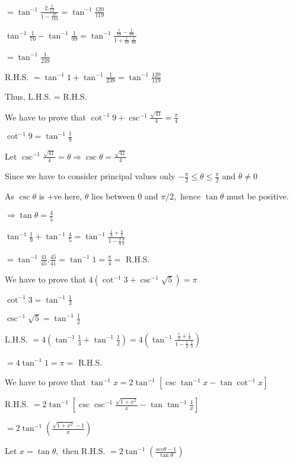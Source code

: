   $= \tan^{-1}\frac{2.\frac{5}{12}}{1 - \frac{25}{144}} = \tan^{-1}\frac{120}{119}$

  $\tan^{-1}\frac{1}{70} - \tan^{-1}\frac{1}{99} = \tan^{-1}\frac{\frac{1}{70} - \frac{1}{99}}{1 +
    \frac{1}{70}.\frac{1}{99}}$

  $= \tan^{-1}\frac{1}{239}$

  R.H.S. $= \tan^{-1}1 + \tan^{-1}\frac{1}{239} = \tan^{-1}\frac{120}{119}$

  Thus, L.H.S. = R.H.S.

\item We have to prove that $\cot^{-1}9 + \csc^{-1}\frac{\sqrt{41}}{4} = \frac{\pi}{4}$

  $\cot^{-1}9 = \tan^{-1}\frac{1}{9}$

  Let $\csc^{-1}\frac{\sqrt{41}}{4} = \theta \Rightarrow \csc\theta = \frac{\sqrt{41}}{4}$

  Since we have to consider principal values only $-\frac{\pi}{2}\leq \theta\leq \frac{\pi}{2}$ and $\theta \neq 0$

  As $\csc\theta$ is +ve here, $\theta$ lies between $0$ and $\pi/2,$ hence $\tan\theta$ must be
  positive.

  $\Rightarrow \tan\theta = \frac{4}{5}$

  $\tan^{-1}\frac{1}{9} + \tan^{-1}\frac{4}{5} = \tan^{-1}\frac{\frac{1}{9} + \frac{4}{5}}{1 - \frac{1}{9}\frac{4}{5}}$

  $=\tan^{-1}\frac{41}{45}.\frac{45}{41} = \tan^{-1}1 = \frac{\pi}{4} =$ R.H.S.

\item We have to prove that $4(\cot^{-1}3 + \csc^{-1}\sqrt{5}) = \pi$

  $\cot^{-1}3 = \tan^{-1}\frac{1}{3}$

  $\csc^{-1}\sqrt{5} = \tan^{-1}\frac{1}{2}$

  L.H.S. $=4(\tan^{-1}\frac{1}{3} + \tan^{-1}\frac{1}{2}) = 4\left(\tan^{-1}\frac{\frac{1}{2} + \frac{1}{3}}{1 -
    \frac{1}{2}.\frac{1}{3}}\right)$

  $= 4\tan^{-1}1 = \pi =$ R.H.S.

\item We have to prove that $\tan^{-1}x = 2\tan^{-1}[\csc\tan^{-1}x - \tan\cot^{-1}x]$

  R.H.S. $= 2\tan^{-1}[\csc\csc^{-1}\frac{\sqrt{1 + x^2}}{x} - \tan\tan^{-1}\frac{1}{x}]$

  $= 2\tan^{-1}\left(\frac{\sqrt{1 + x^2} - 1}{x}\right)$

  Let $x = \tan\theta,$ then R.H.S. $= 2\tan^{-1}\left(\frac{sec\theta - 1}{\tan\theta}\right)$

